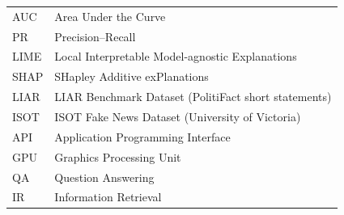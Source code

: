 \begin{longtable}{L{1.6in} L{4.0in}}
AUC & Area Under the Curve \\
PR & Precision--Recall \\
LIME & Local Interpretable Model-agnostic Explanations \\
SHAP & SHapley Additive exPlanations \\
LIAR & LIAR Benchmark Dataset (PolitiFact short statements) \\
ISOT & ISOT Fake News Dataset (University of Victoria) \\
API & Application Programming Interface \\
GPU & Graphics Processing Unit \\
QA & Question Answering \\
IR & Information Retrieval
\end{longtable}
